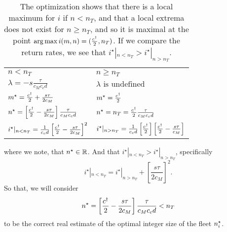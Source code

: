 \documentclass[a4paper]{report}
\DeclareMathOperator*{\argmax}{arg\,max}
\begin{document}
\def\ils{i^\star|_{n<n_T}}
\def\igs{i^\star|_{n>n_T}}
\begin{table}[h!]
	\centering
	\begin{tabular}{p{}| p{}}
		$n < n_T$								& $n \geq n_T$ \\
		$\lambda= -s\frac{\tau}{c_Mc_cd}$			& $\lambda \text{ is undefined}$ \\
		$m^{\star}=\frac{c^{\dagger}}{2}+\frac{s\tau}{2c_M}$		& $m^{\star}= \frac{c^{\dagger}}{2}$ \\
		$n^\star=\left[\frac{c^{\dagger}}{2}-\frac{s\tau}{2c_M}\right]\frac{\tau}{c_Mc_cd}$ & $n^\star=n_T=\frac{c^{\dagger}}{2}\frac{\tau}{c_Mc_cd}$ \\
		$ \ils=\frac{1}{c_cd} \left[\frac{\cd}{2}-\frac{s\tau}{2c_M}\right]^2$	&
		$ \igs=\frac{1}{c_cd}\left[\frac{\cd}{2}\right]\left[\frac{\cd}{2}-\frac{s\tau}{c_M}\right] $
	\end{tabular}
	\caption{The optimization shows that there is a local maximum for $i$ if $n<n_T$, and that a local extrema does not exist for $n\geq n_T$, and so it is maximal at the point $\argmax i(m,n)= (\frac{\cd}{2},n_T)$. If we compare the return rates, we see that $\ils>\igs$.}
	\label{tab:twolagrangesolution}
\end{table}

where we note, that $n^\star\in\mathbb{R}$. And that $\ils>\igs$, specifically $$\ils = \igs + \left[\frac{s\tau}{2c_M}\right]^2.$$  So that, we will consider $$n^\star=\left[\frac{c^{\dagger}}{2}-\frac{s\tau}{2c_M}\right]\frac{\tau}{c_Mc_cd}<n_T$$ to be the correct real estimate of the optimal integer size of the fleet $n^\star_i$.
\end{document}
